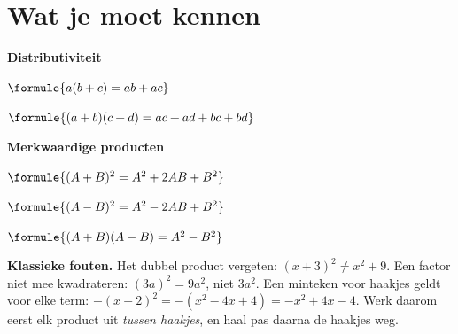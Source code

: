 %



\section{Wat je moet kennen}

\begin{theorie}
\begin{minipage}[t]{.47\linewidth}
\vspace{0pt}
\textbf{\textcolor{accent}{Distributiviteit}}

\vspace{1mm}
$\formule{a(b + c) = ab + ac}$

\vspace{1mm}
$\formule{(a + b)(c + d) = ac + ad + bc + bd}$
\end{minipage}\hfill
\begin{minipage}[t]{.47\linewidth}
\vspace{0pt}
\textbf{\textcolor{accent}{Merkwaardige producten}}

\vspace{1mm}
$\formule{(A + B)^2 = A^2 + 2AB + B^2}$

\vspace{1mm}
$\formule{(A - B)^2 = A^2 - 2AB + B^2}$

\vspace{1mm}
$\formule{(A + B)(A - B) = A^2 - B^2}$
\end{minipage}
\end{theorie}

\textbf{Klassieke fouten.} Het dubbel product vergeten: $(x + 3)^2 \neq x^2 + 9$. Een factor niet mee kwadrateren: $(3a)^2 = 9a^2$, niet $3a^2$. Een minteken voor haakjes geldt voor elke term: $-(x - 2)^2 = -(x^2 - 4x + 4) = -x^2 + 4x - 4$. Werk daarom eerst elk product uit \emph{tussen haakjes}, en haal pas daarna de haakjes weg.

